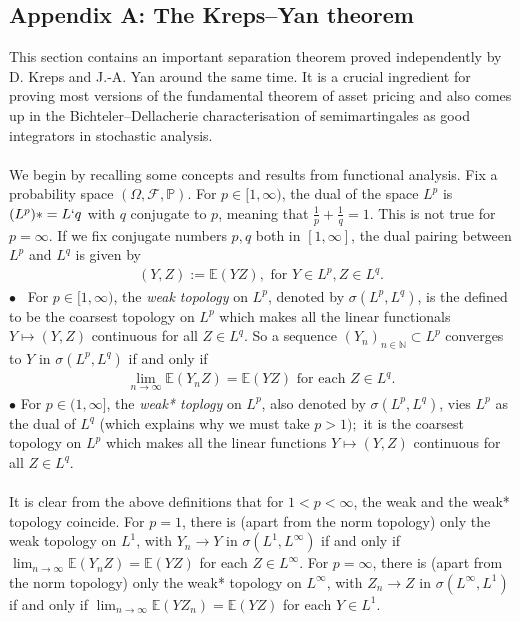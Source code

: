 \documentclass[12pt,a4paper, twoside]{article}
\theoremstyle{definition}
\newcommand{\EE}{\mathbb{E}} %
\newcommand{\PP}{\mathbb{P}} %
\begin{document}
\subsection{Appendix A: The Kreps–Yan theorem}
This section contains an important separation theorem proved independently by D. Kreps
and J.-A. Yan around the same time. It is a crucial ingredient
for proving most versions
of the fundamental theorem of asset pricing and also comes up
in the Bichteler–Dellacherie
characterisation of semimartingales as good integrators in stochastic analysis.
\\\\
We begin by recalling some concepts and results from functional analysis. Fix a probability space $( \Omega, \mathcal{F}, \PP)$. For $p \in [1, \infty)$, the dual of the space $L^p$ is $(L^p)*=L`q$ with $q$ conjugate to $p$, meaning that $\frac{1}{p}+ \frac{1}{q}=1$. This is not true for $p= \infty$. If we fix conjugate numbers $p,q$ both in $[1,  \infty]$, the dual pairing between $L^p$ and $L^q$ is given by 
\begin{align*}
(Y,Z):= \EE(YZ), \text{ for } Y \in L^p,  Z \in L^q.
\end{align*}
$\bullet$ \ For $p \in [1, \infty)$, the \textit{weak topology} on $L^p$, denoted by $\sigma(L^p, L^q)$, is the defined to be the coarsest topology on $L^p$ which makes all the linear functionals $Y \mapsto (Y,Z)$ continuous for all $Z \in L^q$. So a sequence $(Y_n)_{n \in \mathbb{N}} \subset L^p$ converges to $Y$ in $\sigma(L^p,  L^q)$ if and only if  
\begin{align*}
\lim_{n \to \infty} \EE(Y_n Z)= \EE(YZ) \text{ for each } Z \in L^q.
\end{align*}
$\bullet$  For $p \in (1, \infty]$, the \textit{weak* toplogy} on $L^p$, also denoted by $\sigma(L^p, L^q)$, vies $L^p$ as the dual of $L^q$ (which explains why we must take $p>1);$ it is the coarsest topology on $L^p$ which makes all the linear functions $Y \mapsto (Y,Z)$ continuous for all $Z \in L^q$. \\
\\
It is clear from the above definitions that for $1<p< \infty$, the weak and the weak* topology coincide. For $p=1$, there is (apart from the norm topology) only the weak topology on $L^1$, with $Y_n \to Y$ in $\sigma(L^1, L^\infty)$ if and only if $\lim_{n \to \infty} \EE(Y_n Z) = \EE(YZ)$ for each $Z \in L^\infty$. For $p= \infty$, there is (apart from the norm topology) only the weak* topology on $L^\infty$, with $Z_n \to Z$ in $\sigma(L^\infty,  L^1)$ if and only if $\lim_{n \to \infty} \EE(Y Z_n)= \EE(YZ)$ for each $Y \in L^1$. 
\end{document}
